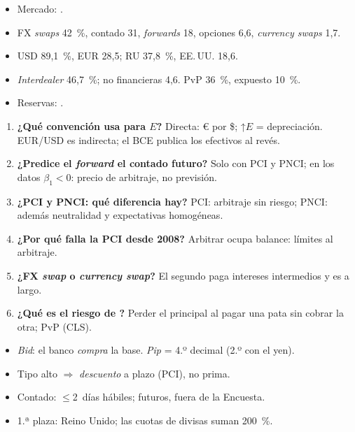 \documentclass{article}
\begin{document}
\begin{columnas}
\anexorepaso
{}
\begin{itemize}
\item Mercado: .
\item FX \emph{swaps} 42~\%, contado 31, \emph{forwards} 18, opciones 6,6, \emph{currency swaps} 1,7.
\item USD 89,1~\%, EUR 28,5; RU 37,8~\%, EE.\,UU. 18,6.
\item \emph{Interdealer} 46,7~\%; no financieras 4,6. PvP 36~\%, expuesto 10~\%.
\item Reservas: .
\end{itemize}
\begin{enumerate}
\item \textbf{¿Qué convención usa para $E$?} Directa: € por \$; ↑$E$ = depreciación. EUR/USD es indirecta; el BCE publica los efectivos al revés.
\item \textbf{¿Predice el \emph{forward} el contado futuro?} Solo con PCI y PNCI; en los datos $\beta_1<0$: precio de arbitraje, no previsión.
\item \textbf{¿PCI y PNCI: qué diferencia hay?} PCI: arbitraje sin riesgo; PNCI: además neutralidad y expectativas homogéneas.
\item \textbf{¿Por qué falla la PCI desde 2008?} Arbitrar ocupa balance: límites al arbitraje.
\item \textbf{¿FX \emph{swap} o \emph{currency swap}?} El segundo paga intereses intermedios y es a largo.
\item \textbf{¿Qué es el riesgo de ?} Perder el principal al pagar una pata sin cobrar la otra; PvP (CLS).
\end{enumerate}
\begin{trampa}
\begin{itemize}
\item \emph{Bid}: el banco \emph{compra} la base. \emph{Pip} = 4.º decimal (2.º con el yen).
\item Tipo alto $\Rightarrow$ \emph{descuento} a plazo (PCI), no prima.
\item Contado: $\leq$2~días hábiles; futuros, fuera de la Encuesta.
\item 1.ª plaza: Reino Unido; las cuotas de divisas suman 200~\%.
\end{itemize}
\end{trampa}

\end{columnas}
\end{document}
